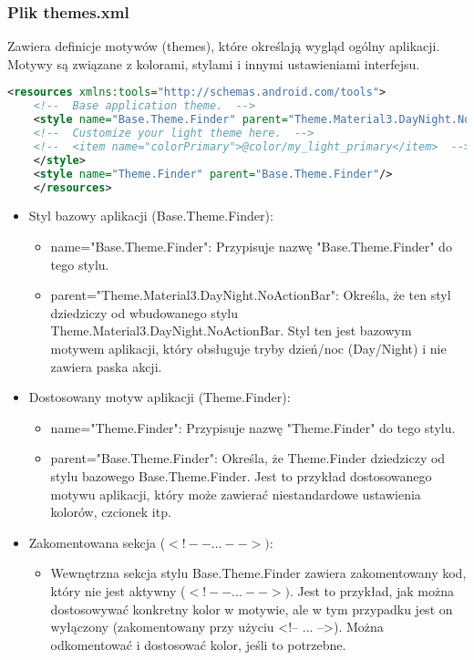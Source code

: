 \subsubsection{Plik themes.xml}
Zawiera definicje motywów (themes), które określają wygląd ogólny aplikacji. Motywy są związane z kolorami, stylami i innymi ustawieniami interfejsu.
\begin{lstlisting}[caption=themes.xml, label={lst:kod.xml}, language=XML]
	<resources xmlns:tools="http://schemas.android.com/tools">
	<!--  Base application theme.  -->
	<style name="Base.Theme.Finder" parent="Theme.Material3.DayNight.NoActionBar">
	<!--  Customize your light theme here.  -->
	<!--  <item name="colorPrimary">@color/my_light_primary</item>  -->
	</style>
	<style name="Theme.Finder" parent="Base.Theme.Finder"/>
	</resources>
\end{lstlisting}
\begin{itemize}
	\item Styl bazowy aplikacji (Base.Theme.Finder):
	\begin{itemize}
		\item name="Base.Theme.Finder": Przypisuje nazwę "Base.Theme.Finder" do tego stylu.
		\item parent="Theme.Material3.DayNight.NoActionBar": Określa, że ten styl dziedziczy od wbudowanego stylu Theme.Material3.DayNight.NoActionBar. Styl ten jest bazowym motywem aplikacji, który obsługuje tryby dzień/noc (Day/Night) i nie zawiera paska akcji.
	\end{itemize}
	\item Dostosowany motyw aplikacji (Theme.Finder):
	\begin{itemize}
		\item name="Theme.Finder": Przypisuje nazwę "Theme.Finder" do tego stylu.
		\item parent="Base.Theme.Finder": Określa, że Theme.Finder dziedziczy od stylu bazowego Base.Theme.Finder. Jest to przykład dostosowanego motywu aplikacji, który może zawierać niestandardowe ustawienia kolorów, czcionek itp.
	\end{itemize}
	\item Zakomentowana sekcja (\(<!-- ... -->)\):
	\begin{itemize}
		\item Wewnętrzna sekcja stylu Base.Theme.Finder zawiera zakomentowany kod, który nie jest aktywny (\(<!-- ... -->)\). Jest to przykład, jak można dostosowywać konkretny kolor w motywie, ale w tym przypadku jest on wyłączony (zakomentowany przy użyciu <!-- ... -->). Można odkomentować i dostosować kolor, jeśli to potrzebne.
	\end{itemize}
\end{itemize}
